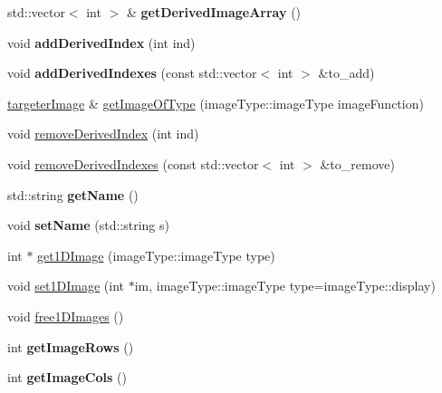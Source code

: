 \begin{DoxyCompactItemize}
std\+::vector$<$ int $>$ \& {\bfseries get\+Derived\+Image\+Array} ()
\item 
\mbox{\label{classtargeter_image_a9a1a800e49ba929db6b9611f28631d76}} 
void {\bfseries add\+Derived\+Index} (int ind)
\item 
\mbox{\label{classtargeter_image_a4e30051ac89f5982d8f363df9dbf76da}} 
void {\bfseries add\+Derived\+Indexes} (const std\+::vector$<$ int $>$ \&to\+\_\+add)
\item 
\hyperlink{classtargeter_image}{targeter\+Image} \& \hyperlink{classtargeter_image_a92b7c1e3195bc50b112fc67f161b9723}{get\+Image\+Of\+Type} (image\+Type\+::image\+Type image\+Function)
\item 
void \hyperlink{classtargeter_image_ac18fa800316f0d23610318ccf1b35bfc}{remove\+Derived\+Index} (int ind)
\item 
void \hyperlink{classtargeter_image_a578e6fabf498c693b7183437ea4dd9e2}{remove\+Derived\+Indexes} (const std\+::vector$<$ int $>$ \&to\+\_\+remove)
\item 
\mbox{\label{classtargeter_image_ad718efc259fbb42c457a41d5148e2d0b}} 
std\+::string {\bfseries get\+Name} ()
\item 
\mbox{\label{classtargeter_image_a88d07fb21e05b2883f9e3672fce0528f}} 
void {\bfseries set\+Name} (std\+::string s)
\item 
int $\ast$ \hyperlink{classtargeter_image_a7e046315df5fec0ac687a4a6beee1a63}{get1\+D\+Image} (image\+Type\+::image\+Type type)
\item 
void \hyperlink{classtargeter_image_abcdf64a3dcbb3fc4c9d4a79e9fd658fc}{set1\+D\+Image} (int $\ast$im, image\+Type\+::image\+Type type=image\+Type\+::display)
\item 
void \hyperlink{classtargeter_image_a45f6264d5e1ce760c376b1348137d970}{free1\+D\+Images} ()
\item 
\mbox{\label{classtargeter_image_ae035ad0f4ad898343955b501d05c75d2}} 
int {\bfseries get\+Image\+Rows} ()
\item 
\mbox{\label{classtargeter_image_aa206240f0c2882288a6370b631bc2ce7}} 
int {\bfseries get\+Image\+Cols} ()
\item 

\end{DoxyCompactItemize}
